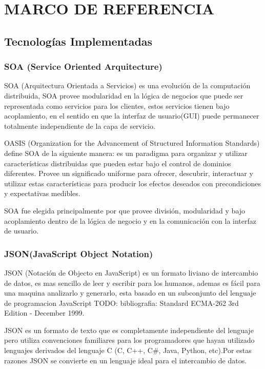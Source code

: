 \section{MARCO DE REFERENCIA}

\subsection{Tecnologías Implementadas}

\subsubsection*{SOA (Service Oriented Arquitecture)}

SOA (Arquitectura Orientada a Servicios) es una evolución de la computación distribuida, SOA provee modularidad en la lógica de negocios que puede ser representada como servicios para los clientes, estos servicios tienen bajo acoplamiento, en el sentido en que la interfaz de usuario(GUI) puede permanecer totalmente independiente de la capa de servicio.

OASIS (Organization for the Advancement of Structured Information Standards) define SOA de la siguiente manera: es un paradigma para organizar y utilizar características distribuidas que pueden estar bajo el control de dominios diferentes. Provee un significado uniforme para ofrecer, descubrir, interactuar y utilizar estas características para producir los efectos deseados con precondiciones y expectativas medibles.

SOA fue elegida principalmente por que provee división, modularidad y bajo acoplamiento dentro de la lógica de negocio y en la comunicación con la interfaz de usuario.


\subsubsection*{JSON(JavaScript Object Notation) \cite{json} }

JSON (Notación de Objecto en JavaScript) es un formato liviano de intercambio de datos, es mas sencillo de leer y escribir para los humanos, ademas es fácil para una maquina analizarlo y generarlo, esta basado en un subconjunto del lenguaje de programacion JavaScript TODO: bibliografia: Standard ECMA-262 3rd Edition - December 1999.

JSON es un formato de texto que es completamente independiente del lenguaje pero utiliza convenciones familiares para los programadores que hayan utilizado lenguajes derivados del lenguaje C (C, C++, C\#, Java, Python, etc).\newline Por estas razones JSON se convierte en un lenguaje ideal para el intercambio de datos.

